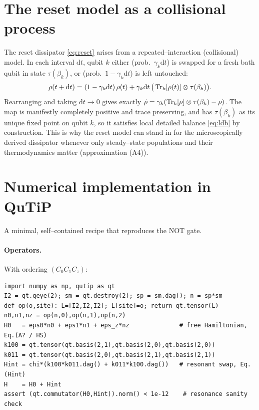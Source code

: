 \documentclass[11pt,a4paper]{article}
\renewcommand{\dd}{\mathrm{d}}
\theoremstyle{definition}
\theoremstyle{remark}
\begin{document}
\section{The reset model as a collisional process}
\label{app:reset}
The reset dissipator \eqref{eq:reset} arises from a repeated--interaction
(collisional) model. In each interval $\dd t$, qubit $k$ either (prob.\
$\gamma_k\dd t$) is swapped for a fresh bath qubit in state
$\tau(\beta_k)$, or (prob.\ $1-\gamma_k\dd t$) is left untouched:
\begin{equation}
\rho(t+\dd t) = (1-\gamma_k\dd t)\,\rho(t)
+ \gamma_k\dd t\,\big(\Tr_k[\rho(t)]\otimes\tau(\beta_k)\big).
\end{equation}
Rearranging and taking $\dd t\to0$ gives exactly
$\dot\rho=\gamma_k(\Tr_k[\rho]\otimes\tau(\beta_k)-\rho)$. The map is
manifestly completely positive and trace preserving, and has
$\tau(\beta_k)$ as its unique fixed point on qubit $k$, so it satisfies
local detailed balance \eqref{eq:ldb} by construction. This is why the
reset model can stand in for the microscopically derived dissipator
whenever only steady--state populations and their thermodynamics matter
(approximation (A4)).

\section{Numerical implementation in QuTiP}
\label{app:numerics}
A minimal, self--contained recipe that reproduces the NOT gate.

\paragraph{Operators.} With ordering $(C_0C_1C_z)$:
\begin{verbatim}
import numpy as np, qutip as qt
I2 = qt.qeye(2); sm = qt.destroy(2); sp = sm.dag(); n = sp*sm
def op(o,site): L=[I2,I2,I2]; L[site]=o; return qt.tensor(L)
n0,n1,nz = op(n,0),op(n,1),op(n,2)
H0   = eps0*n0 + eps1*n1 + eps_z*nz              # free Hamiltonian, Eq.(A? / HS)
k100 = qt.tensor(qt.basis(2,1),qt.basis(2,0),qt.basis(2,0))
k011 = qt.tensor(qt.basis(2,0),qt.basis(2,1),qt.basis(2,1))
Hint = chi*(k100*k011.dag() + k011*k100.dag())   # resonant swap, Eq.(Hint)
H    = H0 + Hint
assert (qt.commutator(H0,Hint)).norm() < 1e-12    # resonance sanity check
\end{verbatim}
\end{document}
